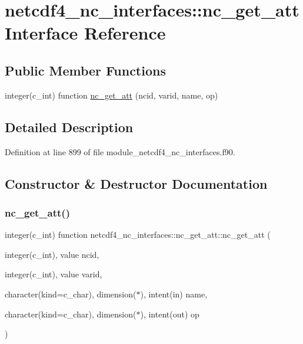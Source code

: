 \hypertarget{interfacenetcdf4__nc__interfaces_1_1nc__get__att}{}\section{netcdf4\+\_\+nc\+\_\+interfaces\+:\+:nc\+\_\+get\+\_\+att Interface Reference}
\label{interfacenetcdf4__nc__interfaces_1_1nc__get__att}
\subsection*{Public Member Functions}
\begin{DoxyCompactItemize}
\item 
integer(c\+\_\+int) function \hyperlink{interfacenetcdf4__nc__interfaces_1_1nc__get__att_aa0981d7dfc07d98408649dbc4d92e9de}{nc\+\_\+get\+\_\+att} (ncid, varid, name, op)
\end{DoxyCompactItemize}


\subsection{Detailed Description}


Definition at line 899 of file module\+\_\+netcdf4\+\_\+nc\+\_\+interfaces.\+f90.



\subsection{Constructor \& Destructor Documentation}
\mbox{\label{interfacenetcdf4__nc__interfaces_1_1nc__get__att_aa0981d7dfc07d98408649dbc4d92e9de}} 
\subsubsection{\texorpdfstring{nc\+\_\+get\+\_\+att()}{nc\_get\_att()}}
{\footnotesize\ttfamily integer(c\+\_\+int) function netcdf4\+\_\+nc\+\_\+interfaces\+::nc\+\_\+get\+\_\+att\+::nc\+\_\+get\+\_\+att (\begin{DoxyParamCaption}\item[{integer(c\+\_\+int), value}]{ncid,  }\item[{integer(c\+\_\+int), value}]{varid,  }\item[{character(kind=c\+\_\+char), dimension($\ast$), intent(in)}]{name,  }\item[{character(kind=c\+\_\+char), dimension($\ast$), intent(out)}]{op }\end{DoxyParamCaption})}



